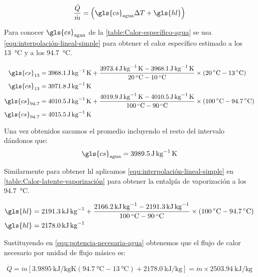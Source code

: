 		\begin{equation}\label{equ:potencia-necesaria-agua}
			\dfrac{\dot{Q}}{\dot{m}} = \left(\gls{cs}_{\text{agua}} \Delta T + \gls{hl}\right)
		\end{equation}
		
		Para conocer $\gls{cs}_{\text{agua}}$ de la \cref{table:Calor-específico-agua} se usa \eqref{equ:interpolación-lineal-simple} para obtener el calor específico estimado a los \qty{13}{\degreeCelsius} y a los \qty{94.7}{\degreeCelsius}.
		
		\begin{align*}
			\gls{cs}_{13} &= \qty{3968.1}{\joule\per\kg\kelvin} + \dfrac{\qty{3973.4}{\joule\per\kg\kelvin} - \qty{3968.1}{\joule\per\kg\kelvin}}{\qty{20}{\degreeCelsius}-\qty{10}{\degreeCelsius}} \times (\qty{20}{\degreeCelsius} - \qty{13}{\degreeCelsius})\\
			\gls{cs}_{13} &= \qty{3971.8}{\joule\per\kg\kelvin}\\
			\gls{cs}_{94.7} &= \qty{4010.5}{\joule\per\kg\kelvin} + \dfrac{\qty{4019.9}{\joule\per\kg\kelvin} - \qty{4010.5}{\joule\per\kg\kelvin}}{\qty{100}{\degreeCelsius}-\qty{90}{\degreeCelsius}} \times (\qty{100}{\degreeCelsius} - \qty{94.7}{\degreeCelsius})\\
			\gls{cs}_{94.7} &= \qty{4015.5}{\joule\per\kg\kelvin}
		\end{align*}
		
		Una vez obtenidos sacamos el promedio incluyendo el resto del intervalo dándonos que:
		\begin{equation*}
			\gls{cs}_{\text{agua}} = \qty{3989.5}{\joule\per\kg\kelvin}
		\end{equation*}
		
		Similarmente para obtener \gls{hl} aplicamos \eqref{equ:interpolación-lineal-simple} en \cref{table:Calor-latente-vaporización} para obtener la entalpía de vaporización a los \qty{94.7}{\degreeCelsius}.
		
		\begin{align*}
			\gls{hl} &= \qty{2191.3}{\kilo\joule\per\kg} + \dfrac{\qty{2166.2}{\kilo\joule\per\kg} - \qty{2191.3}{\kilo\joule\per\kg}}{\qty{100}{\degreeCelsius}-\qty{90}{\degreeCelsius}} \times (\qty{100}{\degreeCelsius} - \qty{94.7}{\degreeCelsius})\\
			\gls{hl} &= \qty{2178.0}{\kilo\joule\per\kg}
		\end{align*}
		
		Sustituyendo en \eqref{equ:potencia-necesaria-agua} obtenemos que el flujo de calor necesario por unidad de flujo másico es:
		
		\begin{equation}\label{equ:potencia-necesaria-sistema}
			\dot{Q} = \dot{m}\left[\qty{3.9895}{\kilo\joule\per\kg\kelvin} \left(\qty{94.7}{\degreeCelsius}-\qty{13}{\degreeCelsius}\right) + \qty{2178.0}{\kilo\joule\per\kg}\right] = \dot{m} \times \qty{2503.94}{\kilo\joule\per\kg}
		\end{equation}